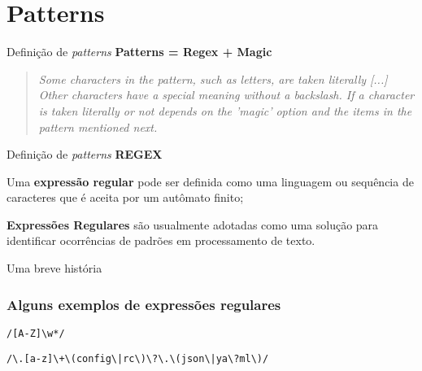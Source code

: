 \section{Patterns}
\begin{frame}{Definição de \textit{patterns}}
  \textbf{Patterns = Regex + Magic}
  \begin{widedescription}
      \item \begin{quotation} \small\it
        Some characters in the pattern, such as letters, are taken literally [...]
        Other characters have a special meaning without a backslash. If a character
        is taken literally or not depends on the 'magic' option and the items in the
        pattern mentioned next\cite{vimReferenceManual}.
      \end{quotation}
  \end{widedescription}
\end{frame}

\begin{frame}{Definição de \textit{patterns}}
  \textbf{REGEX}
  \begin{widedescription}
    \item Uma \textbf{expressão regular} pode ser definida como uma linguagem ou sequência de caracteres que é aceita
    por um autômato finito;
    \item \textbf{Expressões Regulares} são usualmente adotadas como uma solução para identificar ocorrências de
    padrões em processamento de texto.
  \end{widedescription}
\end{frame}

\begin{frame}{Uma breve história}
\end{frame}

\begin{frame}[fragile]\frametitle{Alguns exemplos de expressões regulares}
    \begin{wideitemize}
      \item \verb|/[A-Z]\w*/|
      \item \verb$/\.[a-z]\+\(config\|rc\)\?\.\(json\|ya\?ml\)/$
    \end{wideitemize}
\end{frame}

